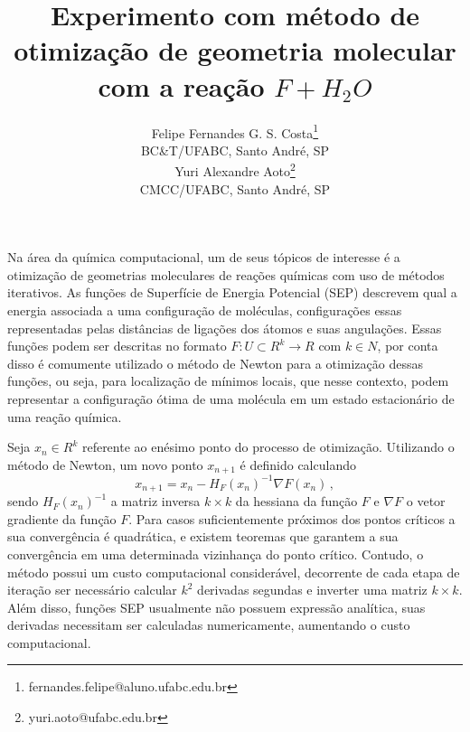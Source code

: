 \documentclass{pssbmac}
\begin{document}

\title{Experimento com método de otimização de geometria molecular com a reação $F + H_2O$}

\author{
    {\large Felipe Fernandes G. S. Costa}\thanks{fernandes.felipe@aluno.ufabc.edu.br} \\
    {\small BC\&T/UFABC, Santo André, SP} \\
    {\large Yuri Alexandre Aoto}\thanks{yuri.aoto@ufabc.edu.br} \\
    {\small CMCC/UFABC, Santo André, SP} \\
}
\criartitulo



Na área da química computacional, um de seus tópicos de interesse é a otimização de geometrias moleculares de reações químicas com uso de métodos iterativos. As funções de Superfície de Energia Potencial (SEP) descrevem qual a energia associada a uma configuração de moléculas, configurações essas representadas pelas distâncias de ligações dos átomos e suas angulações. Essas funções podem ser descritas no formato $F: U \subset R^k\to R$ com $k \in N$, por conta disso é comumente utilizado o método de Newton para a otimização dessas funções, ou seja, para localização de mínimos locais, que nesse contexto, podem representar a configuração ótima de uma molécula em um estado estacionário de uma reação química.

Seja $x_n \in R^k$ referente ao enésimo ponto do processo de otimização. Utilizando o método de Newton, um novo ponto $x_{n+1}$ é definido calculando
%
\begin{equation}
  x_{n+1} = x_n - H_F(x_n)^{-1} \nabla F(x_n) \,,
  \label{eq:newton_method}
\end{equation}
%
sendo $H_F(x_n)^{-1}$ a matriz inversa $k \times k$ da hessiana da função $F$ e $\nabla F$ o vetor gradiente da função $F$. Para casos suficientemente próximos dos pontos críticos a sua convergência é quadrática, e existem teoremas \cite{calculo_numerico_aplicado} que garantem a sua convergência em uma determinada vizinhança do ponto crítico. Contudo, o método possui um custo computacional considerável, decorrente de cada etapa de iteração ser necessário calcular $k^2$ derivadas segundas e inverter uma matriz $k \times k$. Além disso, funções SEP usualmente não possuem expressão analítica, suas derivadas necessitam ser calculadas numericamente, aumentando o custo computacional.
\end{document}
